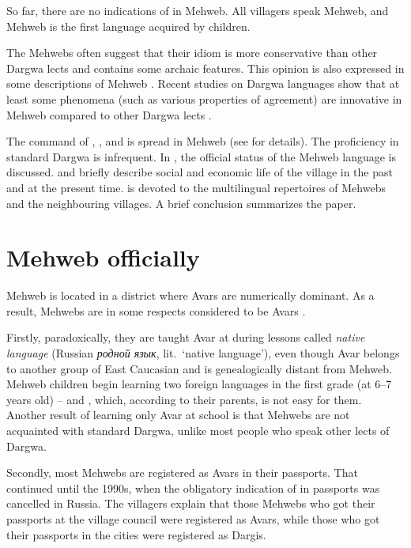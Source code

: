 \documentclass[output=paper]{langsci/langscibook}
\begin{document}
So far, there are no indications of  in Mehweb. All
villagers speak Mehweb, and Mehweb is the first language acquired by
children.

The Mehwebs often suggest that their idiom is more conservative than
other Dargwa lects and contains some archaic features. This opinion is
also expressed in some descriptions of Mehweb \citep{magometov1982,khajdakov1985}.
Recent studies on Dargwa languages show that at least some
phenomena (such as various properties of agreement) are innovative in
Mehweb compared to other Dargwa lects \citep{sumbatova-lander2014}.

The command of , , and  is spread in Mehweb (see 
for details). The proficiency in standard Dargwa is infrequent. In
, the official status of the Mehweb language is discussed.
 and  briefly describe social and economic life of the
village in the past and at the present time.  is devoted to the
multilingual repertoires of Mehwebs and the neighbouring villages. A
brief conclusion summarizes the paper.

\section{Mehweb officially}\label{mehweb-officially}

Mehweb is located in a district where Avars are numerically dominant. As
a result, Mehwebs are in some respects considered to be Avars \citep[98]{tishkov-kisriev2007}.

Firstly, paradoxically, they are taught Avar at  during lessons
called \emph{native language} (Russian \emph{родной язык}, lit.\ `native
language'), even though Avar belongs to another group of East Caucasian
and is genealogically distant from Mehweb. Mehweb children begin
learning two foreign languages in the first grade (at 6–7 years
old) –  and , which, according to their parents, is not
easy for them. Another result of learning only Avar at school is
that Mehwebs are not acquainted with standard Dargwa, unlike most people
who speak other lects of Dargwa.

Secondly, most Mehwebs are registered as Avars in their passports. That
continued until the 1990s, when the obligatory indication of 
in passports was cancelled in Russia. The villagers explain that those
Mehwebs who got their passports at the village council were registered
as Avars, while those who got their passports in the cities were
registered as Dargis.
\end{document}
